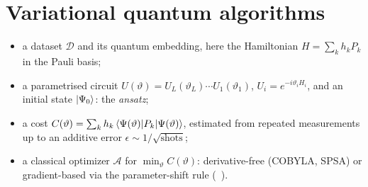 \documentclass[handoutsbeamer.tex]{subfiles}
\begin{document}
\section{Variational quantum algorithms}

\begin{frame}
\onp{\footnotesize}
\begin{itemize}\setlength\itemsep{0.15em}
    \item a dataset $\mathcal D$ and its quantum embedding, here the Hamiltonian $H = \sum_k h_k P_k$ in the Pauli basis;
    \item a parametrised circuit $U(\vartheta) = U_L(\vartheta_L)\cdots U_1(\vartheta_1)$, $U_i = e^{-i\vartheta_iH_i}$, and an initial state $\ket{\Psi_0}$: the \emph{ansatz};
    \item a cost $C(\vartheta) = \sum_k h_k\braket{\Psi(\vartheta)|P_k|\Psi(\vartheta)}$, estimated from repeated measurements up to an additive error $\epsilon \sim 1/\sqrt{\text{shots}}$;
    \item a classical optimizer $\mathcal A$ for $\min_\vartheta C(\vartheta)$: derivative-free (COBYLA, SPSA) or gradient-based via the parameter-shift rule (\Chap~).
\end{itemize}
\end{frame}
\end{document}
